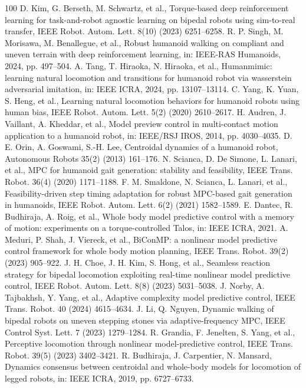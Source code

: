 ﻿\documentclass[preprint,12pt]{elsarticle}
\begin{document}
\begin{thebibliography}{100}
 D. Kim, G. Berseth, M. Schwartz, et al., Torque-based deep reinforcement learning for task-and-robot agnostic learning on bipedal robots using sim-to-real transfer, IEEE Robot. Autom. Lett. 8(10) (2023) 6251--6258.
 R. P. Singh, M. Morisawa, M. Benallegue, et al., Robust humanoid walking on compliant and uneven terrain with deep reinforcement learning, in: IEEE-RAS Humanoids, 2024, pp. 497--504.
 A. Tang, T. Hiraoka, N. Hiraoka, et al., Humanmimic: learning natural locomotion and transitions for humanoid robot via wasserstein adversarial imitation, in: IEEE ICRA, 2024, pp. 13107--13114.
 C. Yang, K. Yuan, S. Heng, et al., Learning natural locomotion behaviors for humanoid robots using human bias, IEEE Robot. Autom. Lett. 5(2) (2020) 2610--2617.
 H. Audren, J. Vaillant, A. Kheddar, et al., Model preview control in multi-contact motion application to a humanoid robot, in: IEEE/RSJ IROS, 2014, pp. 4030--4035.
 D. E. Orin, A. Goswami, S.-H. Lee, Centroidal dynamics of a humanoid robot, Autonomous Robots 35(2) (2013) 161--176.
 N. Scianca, D. De Simone, L. Lanari, et al., MPC for humanoid gait generation: stability and feasibility, IEEE Trans. Robot. 36(4) (2020) 1171--1188.
 F. M. Smaldone, N. Scianca, L. Lanari, et al., Feasibility-driven step timing adaptation for robust MPC-based gait generation in humanoids, IEEE Robot. Autom. Lett. 6(2) (2021) 1582--1589.
 E. Dantec, R. Budhiraja, A. Roig, et al., Whole body model predictive control with a memory of motion: experiments on a torque-controlled Talos, in: IEEE ICRA, 2021.
 A. Meduri, P. Shah, J. Viereck, et al., BiConMP: a nonlinear model predictive control framework for whole body motion planning, IEEE Trans. Robot. 39(2) (2023) 905--922.
 J. H. Choe, J. H. Kim, S. Hong, et al., Seamless reaction strategy for bipedal locomotion exploiting real-time nonlinear model predictive control, IEEE Robot. Autom. Lett. 8(8) (2023) 5031--5038.
 J. Norby, A. Tajbakhsh, Y. Yang, et al., Adaptive complexity model predictive control, IEEE Trans. Robot. 40 (2024) 4615--4634.
 J. Li, Q. Nguyen, Dynamic walking of bipedal robots on uneven stepping stones via adaptive-frequency MPC, IEEE Control Syst. Lett. 7 (2023) 1279--1284.
 R. Grandia, F. Jenelten, S. Yang, et al., Perceptive locomotion through nonlinear model-predictive control, IEEE Trans. Robot. 39(5) (2023) 3402--3421.
 R. Budhiraja, J. Carpentier, N. Mansard, Dynamics consensus between centroidal and whole-body models for locomotion of legged robots, in: IEEE ICRA, 2019, pp. 6727--6733.

\end{thebibliography}
\end{document}
